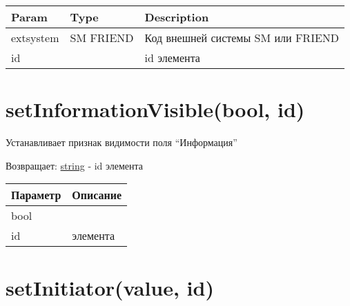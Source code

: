 \begin{longtable}[]{@{}lll@{}}
\toprule
\begin{minipage}[b]{0.30\columnwidth}\raggedright
Param\strut
\end{minipage} & \begin{minipage}[b]{0.30\columnwidth}\raggedright
Type\strut
\end{minipage} & \begin{minipage}[b]{0.30\columnwidth}\raggedright
Description\strut
\end{minipage}\tabularnewline
\midrule
\endhead
\begin{minipage}[t]{0.30\columnwidth}\raggedright
extsystem\strut
\end{minipage} & \begin{minipage}[t]{0.30\columnwidth}\raggedright
SM \textbar{} FRIEND\strut
\end{minipage} & \begin{minipage}[t]{0.30\columnwidth}\raggedright
Код внешней системы SM или FRIEND\strut
\end{minipage}\tabularnewline
\begin{minipage}[t]{0.30\columnwidth}\raggedright
id\strut
\end{minipage} & \begin{minipage}[t]{0.30\columnwidth}\raggedright
\strut
\end{minipage} & \begin{minipage}[t]{0.30\columnwidth}\raggedright
id элемента\strut
\end{minipage}\tabularnewline
\bottomrule
\end{longtable}

\hypertarget{setinformationvisiblebool-id-string}{%
\section{setInformationVisible(bool, id)}\label{setinformationvisiblebool-id-string}}

Устанавливает признак видимости поля ``Информация''

Возвращает: \protect\hyperlink{string}{string} - id элемента

\begin{longtable}[]{@{}ll@{}}
\toprule
Параметр & Описание\tabularnewline
\midrule
\endhead
bool &\tabularnewline
id & элемента\tabularnewline
\bottomrule
\end{longtable}

\hypertarget{setinitiatorvalue-id-string}{%
\section{setInitiator(value, id)}\label{setinitiatorvalue-id-string}}

